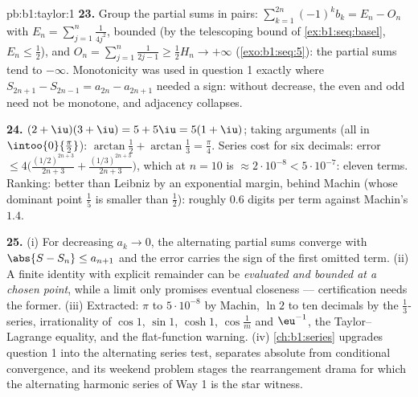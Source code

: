 \begin{solution}{pb:b1:taylor:1}
\textbf{23.} Group the partial sums in pairs: $\sum_{k=1}^{2n}
(-1)^k b_k = E_n - O_n$ with $E_n = \sum_{j=1}^{n}
\frac{1}{4j^2}$, bounded (by the telescoping bound of
\cref{ex:b1:seq:basel}, $E_n \leq \frac12$), and $O_n =
\sum_{j=1}^{n}\frac{1}{2j-1} \geq \frac12 H_n \to +\infty$
(\cref{exo:b1:seq:5}): the partial sums tend to $-\infty$.
Monotonicity was used in question 1 exactly where $S_{2n+1} -
S_{2n-1} = a_{2n} - a_{2n+1}$ needed a sign: without decrease,
the even and odd  need not be monotone, and
adjacency collapses.

\textbf{24.} $(2+\iu)(3+\iu) = 5 + 5\iu = 5(1+\iu)$; taking
arguments (all in $\intoo{0}{\frac\pi2}$): $\arctan\frac12 +
\arctan\frac13 = \frac\pi4$. Series cost for six decimals:
error $\leq 4\bigl(\frac{(1/2)^{2n+3}}{2n+3} +
\frac{(1/3)^{2n+3}}{2n+3}\bigr)$, which at $n = 10$ is
$\approx 2\cdot10^{-8} < 5\cdot10^{-7}$: eleven terms. Ranking:
better than Leibniz by an exponential margin, behind Machin
(whose dominant point $\frac15$ is smaller than $\frac12$):
roughly $0.6$ digits per term against Machin's $1.4$.

\textbf{25.} (i) For decreasing $a_k \to 0$, the alternating
partial sums converge with $\abs{S - S_n} \leq a_{n+1}$ and the
error carries the sign of the first omitted term. (ii) A finite
identity with explicit remainder can be \emph{evaluated and
bounded at a chosen point}, while a limit  only
promises eventual closeness --- certification needs the former.
(iii) Extracted: $\pi$ to $5\cdot10^{-8}$ by Machin, $\ln 2$ to
ten decimals by the $\frac13$-series, irrationality of $\cos 1$,
$\sin 1$, $\cosh 1$, $\cos\frac1m$ and $\eu^{-1}$, the
Taylor--Lagrange equality, and the flat-function warning. (iv)
\cref{ch:b1:series} upgrades question 1 into the alternating
series test, separates absolute from conditional convergence,
and its weekend problem stages the rearrangement drama for
which the alternating harmonic series of Way 1 is the star
witness.
\end{solution}
